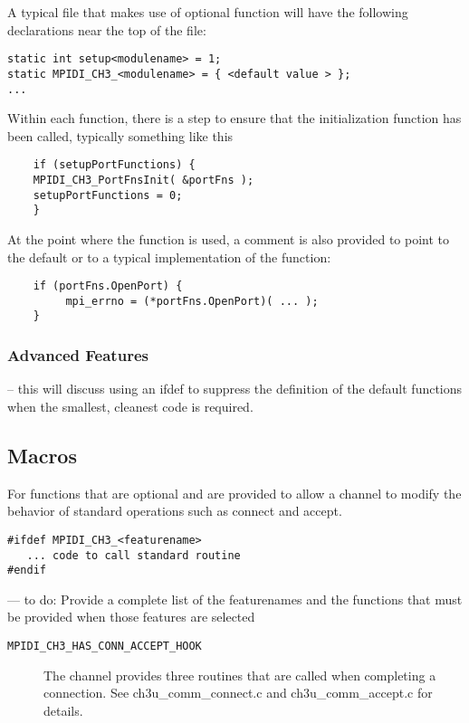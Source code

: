 \documentclass{report}
\begin{document}
A typical file that makes use of optional function will have the
following declarations near the top of the file:
\begin{verbatim}
static int setup<modulename> = 1;
static MPIDI_CH3_<modulename> = { <default value > };
...

\end{verbatim}

Within each function, there is a step to ensure that the
initialization function has been called, typically something like this
\begin{verbatim}
    if (setupPortFunctions) {
	MPIDI_CH3_PortFnsInit( &portFns );
	setupPortFunctions = 0;
    }
\end{verbatim}

At the point where the function is used, a comment is also provided to
point to the default or to a typical implementation of the function:
\begin{verbatim}
    if (portFns.OpenPort) {
         mpi_errno = (*portFns.OpenPort)( ... );
    }
\end{verbatim}

\subsubsection{Advanced Features}
-- this will discuss using an ifdef to suppress the definition of the
   default functions when the smallest, cleanest code is required.

\subsection{Macros}

For functions that are optional and are provided to allow a channel to 
modify the behavior of standard operations such as connect and accept.
\begin{verbatim}
#ifdef MPIDI_CH3_<featurename>
   ... code to call standard routine
#endif
\end{verbatim}

--- to do: Provide a complete list of the featurenames and the
    functions that must be provided when those features are selected

\begin{description}
\item[\texttt{MPIDI\_CH3\_HAS\_CONN\_ACCEPT\_HOOK}]
The channel provides three routines that are called when completing a
connection.  See ch3u\_comm\_connect.c and ch3u\_comm\_accept.c for
details.

\end{description}
\end{document}
